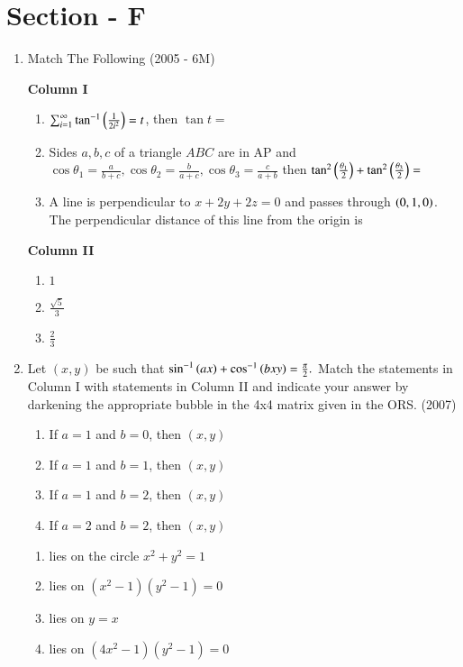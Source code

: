 \documentclass[journal]{IEEEtran}
\begin{document}
\section*{Section - F}
\begin{enumerate}
	\item{
		Match The Following \hfill (2005 - 6M)
		\begin{multicols}{2}
			\textbf{Column I}\\
			\begin{enumerate}
				\item{$\sum_{i=1}^{\infty}\tan^{-1}\left(\frac{1}{2i^2}\right)=t$, then $\tan t =$}
				\item{Sides $a,b,c$ of a triangle $ABC$ are in AP and $\cos\theta_1=\frac{a}{b+c}, \cos\theta_2=\frac{b}{a+c}, \cos\theta_3=\frac{c}{a+b}$ then $\tan^2\left(\frac{\theta_1}{2}\right)+\tan^2\left(\frac{\theta_3}{2}\right) = $}
				\item{A line is perpendicular to $x+2y+2z=0$ and passes through $\left(0,1,0\right)$. The perpendicular distance of this line from the origin is}
			\end{enumerate}
			\columnbreak
			\textbf{Column II}\\
			\begin{enumerate}
				\item{$1$}
				\item{$\frac{\sqrt{5}}{3}$}
				\item{$\frac{2}{3}$}
			\end{enumerate}
		\end{multicols}}
	\item{
		Let $(x,y)$ be such that $\sin^{-1}\left(ax\right)+\cos^{-1}\left(bxy\right)=\frac{\pi}{2}.\\$
		Match the statements in Column I with statements in Column II and indicate your answer by darkening the appropriate bubble in the 4x4 matrix given in the ORS. \hfill (2007)
		\begin{multicols}{2}
			\begin{enumerate}
				\item{If $a=1$ and $b=0$, then $(x, y)$}
				\item{If $a=1$ and $b=1$, then $(x, y)$}
				\item{If $a=1$ and $b=2$, then $(x, y)$}
				\item{If $a=2$ and $b=2$, then $(x, y)$}
			\end{enumerate}
			\columnbreak
			\begin{enumerate}
				\item{lies on the circle $x^2 + y^2 = 1$}
				\item{lies on $(x^2-1)(y^2-1)=0$}
				\item{lies on $y=x$}
				\item{lies on $(4x^2-1)(y^2-1)=0$}
			\end{enumerate}
		\end{multicols}}
	

\end{enumerate}
\end{document}
